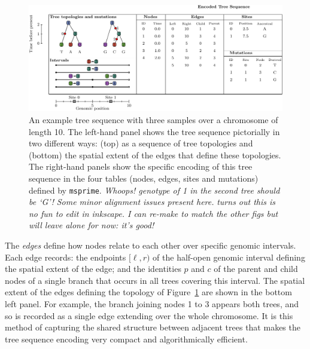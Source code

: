 \documentclass{article}
\newcommand{\msprime}{\texttt{msprime}}
\newcommand{\plr}[1]{{\em \color{blue} #1}}
\newcommand{\jk}[1]{{\em \color{red} #1}}
\begin{document}
\begin{figure}
    \begin{center}
        \includegraphics[width=\textwidth]{example_tree_sequence}
    \end{center}
    \caption{
        An example tree sequence with three samples over a chromosome of length 10.
        The left-hand panel shows the tree sequence pictorially in two different ways:
        (top) as a sequence of tree topologies 
        and (bottom) the spatial extent of the edges that define these topologies. 
        The right-hand panels show the specific encoding
        of this tree sequence in the four tables (nodes, edges, sites and mutations) 
        defined by \msprime.
        \plr{Whoops!  genotype of 1 in the second tree should be `G'!}
        \jk{Some minor alignment issues present here.}
        \plr{turns out this is no fun to edit in inkscape.  
            I can re-make to match the other figs
            but will leave alone for now: it's good!}
        \label{fig:example_tree_sequence}
    }
\end{figure}

The \emph{edges} define how nodes relate to each other over specific genomic intervals. 
Each edge records: 
the endpoints $[\ell, r)$ of the half-open genomic interval defining the
spatial extent of the edge; 
and the identities $p$ and $c$ of the parent and child nodes
of a single branch that occurs in all trees covering this interval.
The spatial extent of the edges defining the topology of Figure~\ref{fig:example_tree_sequence}
are shown in the bottom left panel. 
For example, the branch joining nodes 1 to 3 appears both trees,
and so is recorded as a single edge extending over the whole chromosome. 
It is this method of capturing the shared structure between adjacent trees that makes the
tree sequence encoding very compact and algorithmically efficient.
\end{document}
